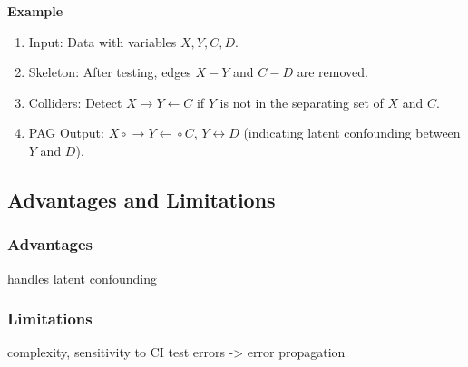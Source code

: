 \documentclass[main.tex]{subfiles}
\begin{document}
\textbf{Example}
\begin{enumerate}
  \item Input: Data with variables $X, Y, C, D$.
  \item Skeleton: After testing, edges $X - Y$ and $C - D$ are removed.
  \item Colliders: Detect $X \rightarrow Y \leftarrow C$ if $Y$ is not in the separating set of $X$ and $C$.
  \item PAG Output: $X \circ\!\!\rightarrow Y \leftarrow\!\!\circ C$, $Y \leftrightarrow D$ (indicating latent confounding between $Y$ and $D$).
\end{enumerate}



\subsection{Advantages and Limitations}
\subsubsection*{Advantages}
 handles latent confounding
\subsubsection*{Limitations}
complexity, sensitivity to CI test errors -> error propagation

\end{document}
